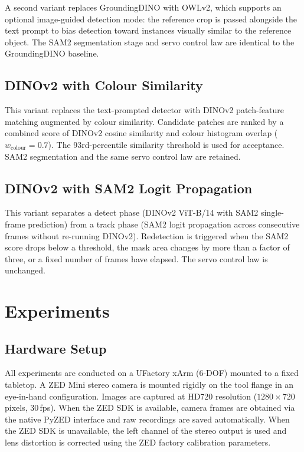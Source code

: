 \documentclass[lettersize,journal]{IEEEtran}
\begin{document}
A second variant replaces GroundingDINO with OWLv2, which supports an
optional image-guided detection mode: the reference crop is passed alongside
the text prompt to bias detection toward instances visually similar to the
reference object. The SAM2 segmentation stage and servo control law are
identical to the GroundingDINO baseline.

\subsection{DINOv2 with Colour Similarity}
\label{sec:dinov2color}

This variant replaces the text-prompted detector with DINOv2 patch-feature
matching augmented by colour similarity. Candidate patches are ranked by a
combined score of DINOv2 cosine similarity and colour histogram overlap
($w_{\text{colour}} = 0.7$). The 93rd-percentile similarity threshold is
used for acceptance. SAM2 segmentation and the same servo control law are
retained.

\subsection{DINOv2 with SAM2 Logit Propagation}
\label{sec:dinov2sam2track}

This variant separates a detect phase (DINOv2 ViT-B/14 with SAM2
single-frame prediction) from a track phase (SAM2 logit propagation
across consecutive frames without re-running DINOv2). Redetection is
triggered when the SAM2 score drops below a threshold, the mask area
changes by more than a factor of three, or a fixed number of frames have
elapsed. The servo control law is unchanged.


\section{Experiments}
\label{sec:experiments}

\subsection{Hardware Setup}
\label{sec:hardware}

All experiments are conducted on a UFactory xArm (6-DOF) mounted to a
fixed tabletop. A ZED Mini stereo camera is mounted rigidly on the tool
flange in an eye-in-hand configuration. Images are captured at HD720
resolution ($1280\times720$ pixels, 30\,fps). When the ZED SDK is
available, camera frames are obtained via the native PyZED interface and
raw recordings are saved automatically. When the ZED SDK is unavailable,
the left channel of the stereo output is used and lens distortion is
corrected using the ZED factory calibration parameters.
\end{document}
